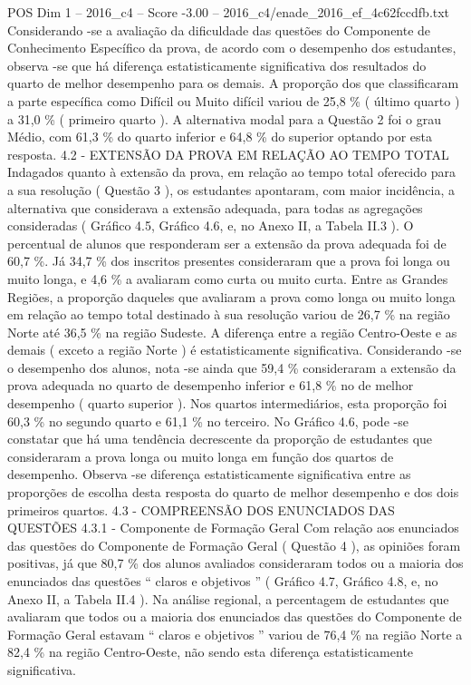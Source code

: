 \begin{textsample}{POS Dim 1 – 2016\_c4 – Score -3.00 – 2016\_c4/enade\_2016\_ef\_4c62fccdfb.txt}
Considerando -se a avaliação da dificuldade das questões do Componente de Conhecimento Específico da prova, de acordo com o desempenho dos estudantes, observa -se que há diferença estatisticamente significativa dos resultados do quarto de melhor desempenho para os demais.
A proporção dos que classificaram a parte específica como Difícil ou Muito difícil variou de 25,8 \% ( último quarto ) a 31,0 \% ( primeiro quarto ).
A alternativa modal para a Questão 2 foi o grau Médio, com 61,3 \% do quarto inferior e 64,8 \% do superior optando por esta resposta. 4.2 - EXTENSÃO DA PROVA EM RELAÇÃO AO TEMPO TOTAL Indagados quanto à extensão da prova, em relação ao tempo total oferecido para a sua resolução ( Questão 3 ), os estudantes apontaram, com maior incidência, a alternativa que considerava a extensão adequada, para todas as agregações consideradas ( Gráfico 4.5, Gráfico 4.6, e, no Anexo II, a Tabela II.3 ).
O percentual de alunos que responderam ser a extensão da prova adequada foi de 60,7 \%.
Já 34,7 \% dos inscritos presentes consideraram que a prova foi longa ou muito longa, e 4,6 \% a avaliaram como curta ou muito curta.
Entre as Grandes Regiões, a proporção daqueles que avaliaram a prova como longa ou muito longa em relação ao tempo total destinado à sua resolução variou de 26,7 \% na região Norte até 36,5 \% na região Sudeste.
A diferença entre a região Centro-Oeste e as demais ( exceto a região Norte ) é estatisticamente significativa.
Considerando -se o desempenho dos alunos, nota -se ainda que 59,4 \% consideraram a extensão da prova adequada no quarto de desempenho inferior e 61,8 \% no de melhor desempenho ( quarto superior ).
Nos quartos intermediários, esta proporção foi 60,3 \% no segundo quarto e 61,1 \% no terceiro.
No Gráfico 4.6, pode -se constatar que há uma tendência decrescente da proporção de estudantes que consideraram a prova longa ou muito longa em função dos quartos de desempenho.
Observa -se diferença estatisticamente significativa entre as proporções de escolha desta resposta do quarto de melhor desempenho e dos dois primeiros quartos. 4.3 - COMPREENSÃO DOS ENUNCIADOS DAS QUESTÕES 4.3.1 - Componente de Formação Geral Com relação aos enunciados das questões do Componente de Formação Geral ( Questão 4 ), as opiniões foram positivas, já que 80,7 \% dos alunos avaliados consideraram todos ou a maioria dos enunciados das questões “ claros e objetivos ” ( Gráfico 4.7, Gráfico 4.8, e, no Anexo II, a Tabela II.4 ).
Na análise regional, a percentagem de estudantes que avaliaram que todos ou a maioria dos enunciados das questões do Componente de Formação Geral estavam “ claros e objetivos ” variou de 76,4 \% na região Norte a 82,4 \% na região Centro-Oeste, não sendo esta diferença estatisticamente significativa.

\end{textsample}
